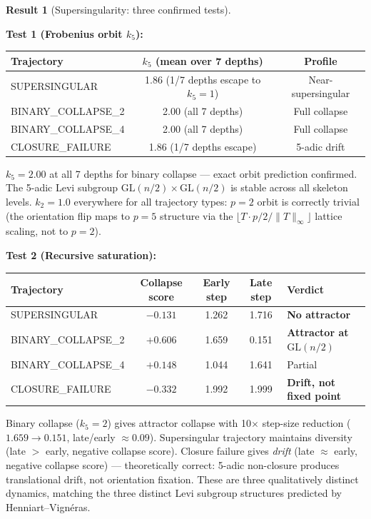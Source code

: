 \documentclass[11pt]{amsart}
\theoremstyle{definition}
\newtheorem{result}[theorem]{Result}
\begin{document}
\begin{result}[Supersingularity: three confirmed tests]
\label{result:supersingularity}

\noindent\textbf{Test 1 (Frobenius orbit $k_5$):}
\begin{center}
\begin{tabular}{@{}lcc@{}}
\toprule
Trajectory & $k_5$ (mean over 7 depths) & Profile \\
\midrule
SUPERSINGULAR & 1.86 (1/7 depths escape to $k_5=1$) & Near-supersingular \\
BINARY\_COLLAPSE\_2 & 2.00 (all 7 depths) & Full collapse \\
BINARY\_COLLAPSE\_4 & 2.00 (all 7 depths) & Full collapse \\
CLOSURE\_FAILURE & 1.86 (1/7 depths escape) & 5-adic drift \\
\bottomrule
\end{tabular}
\end{center}
$k_5 = 2.00$ at all 7 depths for binary collapse --- exact orbit prediction
confirmed. The 5-adic Levi subgroup $\mathrm{GL}(n/2) \times \mathrm{GL}(n/2)$
is stable across all skeleton levels.
$k_2 = 1.0$ everywhere for all trajectory types: $p=2$ orbit is
correctly trivial (the orientation flip maps to $p=5$ structure via
the $\lfloor T \cdot p/2 / \|T\|_\infty \rfloor$ lattice scaling,
not to $p=2$).

\noindent\textbf{Test 2 (Recursive saturation):}
\begin{center}
\begin{tabular}{@{}lcccl@{}}
\toprule
Trajectory & Collapse score & Early step & Late step & Verdict \\
\midrule
SUPERSINGULAR & $-0.131$ & 1.262 & 1.716 & \textbf{No attractor} \\
BINARY\_COLLAPSE\_2 & $+0.606$ & 1.659 & 0.151 & \textbf{Attractor at $\mathrm{GL}(n/2)$} \\
BINARY\_COLLAPSE\_4 & $+0.148$ & 1.044 & 1.641 & Partial \\
CLOSURE\_FAILURE & $-0.332$ & 1.992 & 1.999 & \textbf{Drift, not fixed point} \\
\bottomrule
\end{tabular}
\end{center}
Binary collapse ($k_5=2$) gives attractor collapse with 10$\times$
step-size reduction ($1.659 \to 0.151$, late/early $\approx 0.09$).
Supersingular trajectory maintains diversity (late $>$ early, negative collapse score).
Closure failure gives \emph{drift} (late $\approx$ early, negative collapse score)
--- theoretically correct: 5-adic non-closure produces translational drift,
not orientation fixation.
These are three qualitatively distinct dynamics, matching the three
distinct Levi subgroup structures predicted by Henniart--Vign\'{e}ras.


\end{result}
\end{document}
